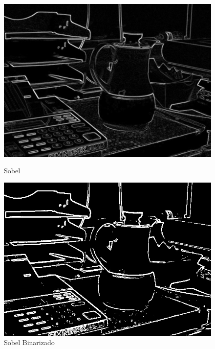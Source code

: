 \documentclass[10pt,twocolumn,letterpaper]{article}
\begin{document}
\begin{figure}[!htb]
  \includegraphics[width=\linewidth]{46-sobeln.jpg}
  \caption{Sobel}\label{fig:sobeln}
\endminipage\hfill
{}
  \includegraphics[width=\linewidth]{46-sobelb.jpg}
  \caption{Sobel Binarizado}\label{fig:sobelb}
\endminipage
\end{figure}
\end{document}
